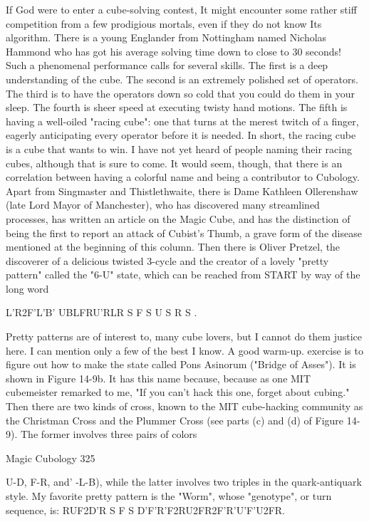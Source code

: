 If God were to enter a cube-solving contest, It might encounter some rather stiff
competition from a few prodigious mortals, even if they do not know Its algorithm.
There is a young Englander from Nottingham named Nicholas Hammond who has got
his average solving time down to close to 30 seconds! Such a phenomenal
performance calls for several skills. The first is a deep understanding of the cube. The
second is an extremely polished set of operators. The third is to have the operators
down so cold that you could do them in your sleep. The fourth is sheer speed at
executing twisty hand motions. The fifth is having a well-oiled "racing cube": one that
turns at the merest twitch of a finger, eagerly anticipating every operator before it is
needed. In short, the racing cube is a cube that wants to win.
        I have not yet heard of people naming their racing cubes, although that is sure
to come. It would seem, though, that there is an correlation between having a colorful
name and being a contributor to Cubology. Apart from Singmaster and Thistlethwaite,
there is Dame Kathleen Ollerenshaw (late Lord Mayor of Manchester), who has
discovered many streamlined processes, has written an article on the Magic Cube, and
has the distinction of being the first to report an attack of Cubist's Thumb, a grave
form of the disease mentioned at the beginning of this column. Then there is Oliver
Pretzel, the discoverer of a delicious twisted 3-cycle and the creator of a lovely "pretty
pattern" called the "6-U" state, which can be reached from START by way of the long
word

       L'R2F'L'B' UBLFRU'RLR S F S U S R S .

        Pretty patterns are of interest to, many cube lovers, but I cannot do them
justice here. I can mention only a few of the best I know. A good warm-up. exercise is
to figure out how to make the state called Pons Asinorum ("Bridge of Asses"). It is
shown in Figure 14-9b. It has this name because, because as one MIT cubemeister
remarked to me, "If you can't hack this one, forget about cubing." Then there are two
kinds of cross, known to the MIT cube-hacking community as the Christman Cross
and the Plummer Cross (see parts (c) and (d) of Figure 14-9). The former involves
three pairs of colors




Magic Cubology                                                                         325

U-D, F-R, and' -L-B), while the latter involves two triples in the quark-antiquark
style. My favorite pretty pattern is the "Worm", whose "genotype", or turn sequence,
is:
        RUF2D'R S F S D'F'R'F2RU2FR2F'R'U'F'U2FR.

